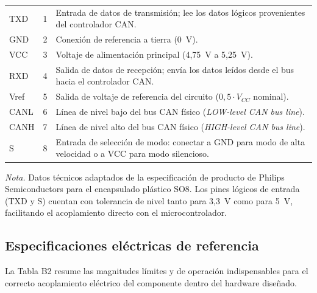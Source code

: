 \begin{center}
	\begin{supertabular}{p{1.5cm} p{1.5cm} p{10.5cm}}
		TXD  & 1 & Entrada de datos de transmisión; lee los datos lógicos provenientes del controlador CAN. \\ 
		GND  & 2 & Conexión de referencia a tierra (0~V). \\ 
		VCC  & 3 & Voltaje de alimentación principal (4,75~V a 5,25~V). \\
		RXD  & 4 & Salida de datos de recepción; envía los datos leídos desde el bus hacia el controlador CAN. \\ 
		Vref & 5 & Salida de voltaje de referencia del circuito ($0{,}5 \cdot V_{CC}$ nominal). \\
		CANL & 6 & Línea de nivel bajo del bus CAN físico (\textit{LOW-level CAN bus line}). \\ 
		CANH & 7 & Línea de nivel alto del bus CAN físico (\textit{HIGH-level CAN bus line}). \\ 
		S    & 8 & Entrada de selección de modo: conectar a GND para modo de alta velocidad o a VCC para modo silencioso. \\ 
	\end{supertabular}
\end{center}

{\raggedright\small\textit{Nota.} Datos técnicos adaptados de la especificación de producto de Philips Semiconductors para el encapsulado plástico SO8. Los pines lógicos de entrada (TXD y S) cuentan con tolerancia de nivel tanto para 3,3~V como para 5~V, facilitando el acoplamiento directo con el microcontrolador.\par}

\vspace{2mm}
\subsection*{Especificaciones eléctricas de referencia}
La Tabla B2 resume las magnitudes límites y de operación indispensables para el correcto acoplamiento eléctrico del componente dentro del hardware diseñado.

\vspace{2mm}

\small
\renewcommand{\arraystretch}{1.3}
\tablelasttail{\bottomrule}

